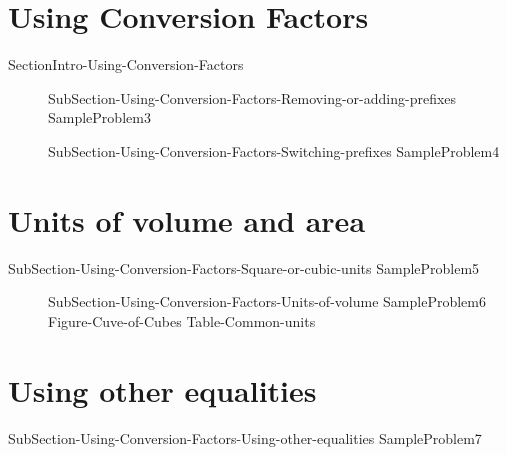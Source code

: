 \documentclass[main.tex]{subfiles}
\newcommand\chapterlabel{Ch-measurements}\setcounter{figurenewcounter}{0}\setcounter{tablenewcounter}{0}\setcounter{formulanewcounter}{0}\chapterpicture{../{\chapterlabel}/figure1}\chapterpicturelabel{PngImg}
\begin{document}
\section{Using Conversion Factors}
{SectionIntro-Using-Conversion-Factors}
\sloppy\begin{description}
\item[]{SubSection-Using-Conversion-Factors-Removing-or-adding-prefixes}
{SampleProblem3}%
\item[]{SubSection-Using-Conversion-Factors-Switching-prefixes}
{SampleProblem4}%
\end{description}

\section{Units of volume and area}
{SubSection-Using-Conversion-Factors-Square-or-cubic-units}
{SampleProblem5}%
\sloppy\begin{description}
\item[]{SubSection-Using-Conversion-Factors-Units-of-volume}
{SampleProblem6}%
{Figure-Cuve-of-Cubes}
{Table-Common-units}
\end{description}


\section{Using other equalities}
{SubSection-Using-Conversion-Factors-Using-other-equalities}
{SampleProblem7}%
\end{document}
